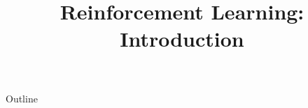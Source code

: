 \documentclass[xcolor=dvipsnames,compress,t,pdf,9pt]{beamer}
\title[\insertframenumber /\inserttotalframenumber]{Reinforcement Learning: Introduction}
\begin{document}
	\begin{frame}
	\titlepage
	\end{frame}

	\begin{frame}{Outline}
	    \tableofcontents
	\end{frame}

	
	
	
\end{document}
